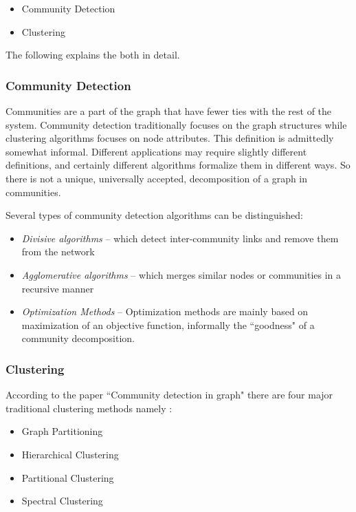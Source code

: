 \begin{itemize}
\item Community Detection
\item Clustering
\end{itemize}
The following explains the both in detail.
\subsubsection{Community Detection}
Communities are a part of the graph that have fewer ties with the rest of the system. Community detection traditionally focuses on the graph structures while clustering algorithms focuses on node attributes. This definition is admittedly somewhat informal. Different applications may require slightly different definitions, and certainly different algorithms formalize them in different ways. So there is not a unique, universally accepted, decomposition of a graph in communities. 

Several types of community detection algorithms can be distinguished:
\begin{itemize}
\item \textit{Divisive algorithms} -- which detect inter-community links and remove them from the network
\item \textit{Agglomerative algorithms} -- which merges similar nodes or communities in a recursive manner
\item  \textit{Optimization Methods} --
Optimization methods are mainly based on maximization of an objective function, informally the ``goodness" of a community decomposition.
\end{itemize}

\subsubsection{Clustering}
According to the paper ``Community detection in graph" \cite{communitypaper} there are four major traditional clustering methods namely : 
\begin{itemize}

\item Graph Partitioning 

\item Hierarchical Clustering

\item Partitional Clustering

\item Spectral Clustering

\end{itemize}

